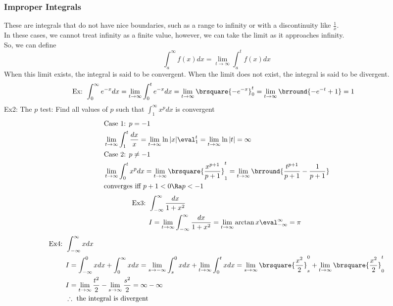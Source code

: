 \subsubsection{Improper Integrals}
These are integrals that do not have nice boundaries, such as a range to infinity or with a discontinuity like $\frac{1}{x}$.\\
In these cases, we cannot treat infinity as a finite value, however, we can take the limit as it approaches infinity.\\
So, we can define
$$\int_a^\infty f(x)dx=\lim_{t\to\infty}\int_a^t f(x)dx$$
When this limit exists, the integral is said to be convergent. When the limit does not exist, the integral is said to be divergent.\\
\begin{align*}
    \text{Ex: }&\int_0^\infty e^{-x}dx=\lim_{t\to\infty}\int_0^te^{-x}dx=\lim_{t\to\infty}\brsquare{-e^{-x}}_0^t=\lim_{t\to\infty}\brround{-e^{-t}+1}=1
\end{align*}
Ex2: The $p$ test: Find all values of $p$ such that $\int_1^\infty x^pdx$ is convergent
\begin{align*}
    &\text{Case 1: }p=-1\\
    &\lim_{t\to\infty}\int_1^t\frac{dx}{x}=\lim_{t\to\infty}{\ln|x|}\eval_1^t=\lim_{t\to\infty}\ln|t|=\infty\\
    &\text{Case 2: }p\neq -1\\
    &\lim_{t\to\infty}\int_0^tx^pdx=\lim_{t\to\infty}\brsquare{\frac{x^{p+1}}{p+1}}_1^t=\lim_{t\to\infty}\brround{\frac{t^{p+1}}{p+1}-\frac{1}{p+1}}\\
    &\text{converges iff }p+1<0\Ra p<-1
\end{align*}
\begin{align*}
    \text{Ex3: }&\int_{-\infty}^\infty\frac{dx}{1+x^2}\\
    &I=\lim_{t\to\infty}\int_{-\infty}^\infty\frac{dx}{1+x^2}=\lim_{t\to\infty}{\arctan x}\eval_{-\infty}^\infty=\pi
\end{align*}
\begin{align*}
    \text{Ex4: }&\int_{-\infty}^\infty xdx\\
    &I=\int_{-\infty}^0xdx+\int_0^\infty xdx=\lim_{s\to-\infty}\int_s^0xdx+\lim_{t\to\infty}\int_0^txdx=\lim_{s\to\infty}\brsquare{\frac{x^2}{2}}_s^0+\lim_{t\to\infty}\brsquare{\frac{x^2}{2}}_0^t\\
    &I=\lim_{t\to\infty}\frac{t^2}{2}-\lim_{s\to\infty}\frac{s^2}{2}=\infty-\infty\\
    &\therefore \text{ the integral is divergent}
\end{align*}
